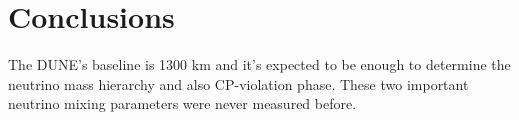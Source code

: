 \section{Conclusions}
The DUNE's baseline is 1300 km and it's expected to be enough to determine the neutrino mass hierarchy and also CP-violation phase. These two important neutrino mixing parameters were never measured before.
